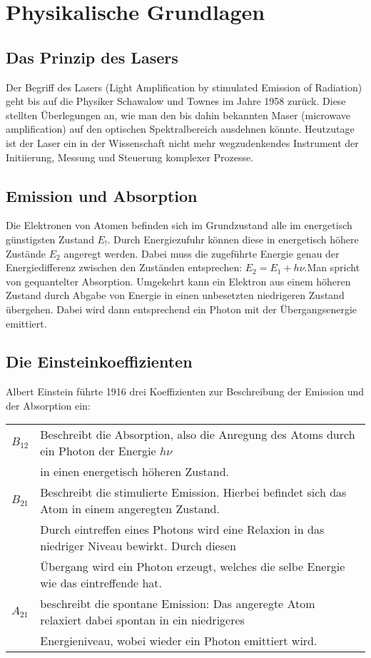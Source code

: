 \section{Physikalische Grundlagen}

\subsection{Das Prinzip des Lasers}
Der Begriff des Lasers (Light Amplification by stimulated Emission of Radiation) geht bis auf die  Physiker Schawalow und Townes im Jahre  1958 zurück. Diese stellten Überlegungen an, wie man den bis dahin  bekannten Maser (microwave amplification) auf den optischen Spektralbereich ausdehnen könnte. Heutzutage ist der Laser ein in der  Wissenschaft nicht mehr wegzudenkendes Instrument der Initiierung,  Messung und Steuerung komplexer Prozesse.

\subsection{Emission und Absorption}
Die Elektronen von Atomen befinden sich im Grundzustand alle im energetisch günstigsten Zustand $E_!$. Durch  Energiezufuhr können diese  in energetisch höhere Zustände $E_2$ angeregt werden. Dabei muss die zugeführte Energie genau der Energiedifferenz zwischen den Zuständen entsprechen: $E_2 = E_1 +h\nu$.Man spricht  von gequantelter Absorption. Umgekehrt kann ein Elektron aus einem höheren Zustand durch  Abgabe von Energie in einen unbesetzten niedrigeren Zustand übergehen.  Dabei wird  dann entsprechend  ein Photon mit der Übergangsenergie emittiert.

\subsection{Die Einsteinkoeffizienten}
Albert Einstein führte 1916 drei Koeffizienten zur Beschreibung der Emission und der Absorption ein:

\begin{tabular}{l l}
$B_{12}$ & Beschreibt die Absorption, also die Anregung des Atoms durch ein Photon der Energie $h\nu$ \\
& in einen energetisch höheren Zustand.\\
$B_{21}$ & Beschreibt die stimulierte Emission. Hierbei befindet sich das Atom in einem angeregten Zustand. \\
& Durch eintreffen eines Photons wird eine Relaxion in das niedriger Niveau bewirkt. Durch diesen\\
&  Übergang wird ein Photon erzeugt, welches die selbe Energie wie das eintreffende hat.\\
$A_{21}$ & beschreibt die spontane Emission: Das angeregte Atom relaxiert dabei spontan in ein niedrigeres\\
& Energieniveau, wobei wieder  ein Photon emittiert wird.
\end{tabular}


